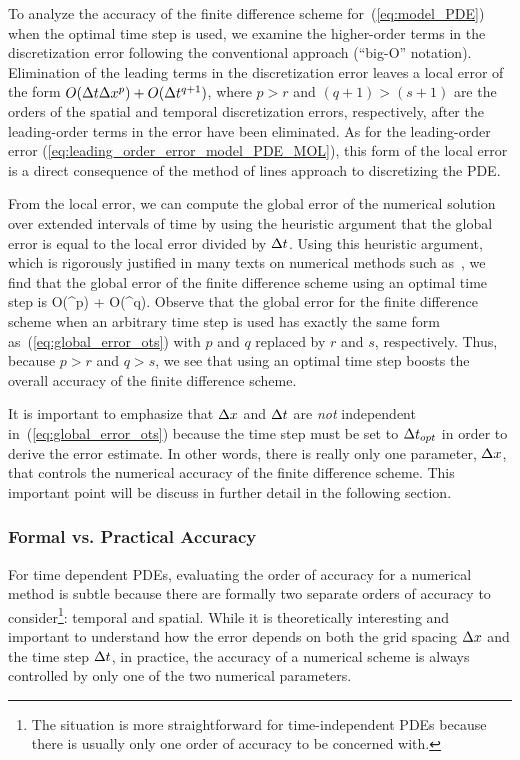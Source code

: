 \documentclass[oneeqnum,onefignum,onetabnum,onethmnum]{siamltex}
\begin{document}
To analyze the accuracy of the finite difference scheme 
for~(\ref{eq:model_PDE}) when the optimal time step is used, we examine the 
higher-order terms in the discretization error following the conventional 
approach (\ie ``big-O'' notation).  Elimination of the leading terms in the 
discretization error leaves a local error of the form 
$O(\Delta t \Delta x^p) + O(\Delta t^{q+1})$, where $p>r$ and $(q+1) > (s+1)$ are the orders 
of the spatial and temporal discretization errors, respectively, after the 
leading-order terms in the error have been eliminated.  As for the 
leading-order error (\ref{eq:leading_order_error_model_PDE_MOL}), this form of 
the local error is a direct consequence of the method of lines approach to 
discretizing the PDE.  

From the local error, we can compute the global error of the numerical 
solution over extended intervals of time by using the heuristic argument
that the global error is equal to the local error divided by $\Delta t$.  Using 
this heuristic argument, which is rigorously justified in many texts on 
numerical methods such as~\cite{gko_book}, we find that the global error of 
the finite difference scheme using an optimal time step is 
\beq
O(\dx^p) + O(\dt^q).
\label{eq:global_error_ots}
\eeq
Observe that the global error for the finite difference scheme when an 
arbitrary time step is used has exactly the same form 
as~(\ref{eq:global_error_ots}) with $p$ and $q$ replaced by $r$ and $s$, 
respectively.  Thus, because $p > r$ and $q > s$, we see that using an optimal 
time step boosts the overall accuracy of the finite difference scheme.  

It is important to emphasize that $\Delta x$ and $\Delta t$ are \emph{not} independent 
in~(\ref{eq:global_error_ots}) because the time step must be set to $\Delta t_{opt}$ 
in order to derive the error estimate.  In other words, there is really only 
one parameter, $\Delta x$, that controls the numerical accuracy of the finite 
difference scheme.  This important point will be discuss in further detail in 
the following section.


\subsubsection*{Formal vs. Practical Accuracy}
For time dependent PDEs, evaluating the order of accuracy for a numerical
method is subtle because there are formally two separate orders of accuracy 
to consider\footnote{The situation is more straightforward for 
time-independent PDEs because there is usually only one order of accuracy to 
be concerned with.}:  temporal and spatial.  While it is theoretically
interesting and important to understand how the error depends on both the 
grid spacing $\Delta x$ and the time step $\Delta t$, in practice, the accuracy 
of a numerical scheme is always controlled by only one of the two numerical
parameters.  
\end{document}
